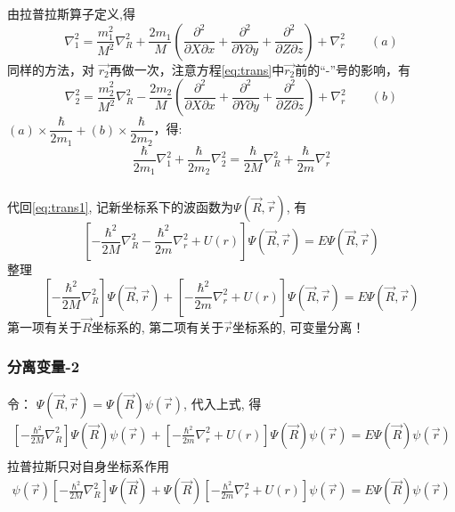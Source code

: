 \begin{frame}
\frametitle{}
由拉普拉斯算子定义,得
$$
  \nabla ^2 _1 = \dfrac{m^2 _1}{M^2 }  \nabla ^2 _R + \dfrac{2m _1}{M }  (\dfrac{\partial^2 }{ \partial X \partial x} +  \dfrac{\partial^2 }{ \partial Y \partial y} + \dfrac{\partial^2 }{ \partial Z \partial z})    + \nabla ^2 _r  \qquad (a)
$$ 
同样的方法，对 $\vec{r_2}$再做一次，注意方程\ref{eq:trans}中$\vec{r_2}$前的“-”号的影响，有
$$
\nabla ^2 _2= \dfrac{m^2 _2}{M^2 }  \nabla ^2 _R - \dfrac{2m _2}{M }  (\dfrac{\partial^2 }{ \partial X \partial x} +  \dfrac{\partial^2 }{ \partial Y \partial y} + \dfrac{\partial^2 }{ \partial Z \partial z})    + \nabla ^2 _r \qquad (b) 
$$ 
$(a)\times \dfrac{\hbar}{2m_1}+(b)\times \dfrac{\hbar}{2m_2} $，得:	
\begin{equation*}
\dfrac{\hbar}{2m_1}\nabla ^2 _1	+ \dfrac{\hbar}{2m_2}\nabla ^2 _2 = \dfrac{\hbar}{2M}\nabla ^2 _R+ \dfrac{\hbar}{2m}\nabla ^2 _r
\end{equation*}	
\end{frame} 

\begin{frame}
\frametitle{}
代回\ref{eq:trans1}, 记新坐标系下的波函数为$ \Psi (\vec{R},\vec{r}) $, 有
\begin{equation} \label{eq:hydr-2}
\left[-\frac{\hbar^2}{2 M} \nabla_R ^2  -\frac{\hbar^2}{2 m} \nabla_r ^2 +U(r) \right] \Psi (\vec{R},\vec{r}) =E \Psi (\vec{R},\vec{r}) 
\end{equation} 
整理
\begin{equation*} 
\left[-\frac{\hbar^2}{2 M} \nabla_R ^2 \right] \Psi (\vec{R},\vec{r}) +  \left[-\frac{\hbar^2}{2 m} \nabla_r ^2 +U(r) \right] \Psi (\vec{R},\vec{r}) =E \Psi (\vec{R},\vec{r}) 
\end{equation*}
第一项有关于$\vec{R}$坐标系的, 第二项有关于$\vec{r}$坐标系的, 可变量分离！
\end{frame} 

\begin{frame}
\frametitle{分离变量-2}
令： $\Psi (\vec{R},\vec{r}) = \Psi (\vec{R}) \psi (\vec{r})  $, 代入上式, 得
\[
\begin{aligned}
  \left[-\frac{\hbar^2}{2 M} \nabla_R ^2 \right] \Psi (\vec{R}) \psi (\vec{r}) +  \left[-\frac{\hbar^2}{2 m} \nabla_r ^2 +U(r) \right] \Psi (\vec{R}) \psi (\vec{r})=E \Psi (\vec{R}) \psi (\vec{r}) \\ 
  \end{aligned}
\]
拉普拉斯只对自身坐标系作用
\[
\begin{aligned}
\psi (\vec{r})\left[-\frac{\hbar^2}{2 M} \nabla_R ^2 \right] \Psi (\vec{R})  +  \Psi (\vec{R})\left[-\frac{\hbar^2}{2 m} \nabla_r ^2 +U(r) \right]  \psi (\vec{r})=E \Psi (\vec{R}) \psi (\vec{r}) \\ 
\end{aligned}
\]
\end{frame} 

